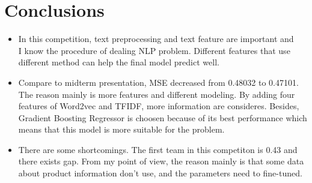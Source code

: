 \section{Conclusions} \label{sec-conclusions}
\begin{itemize}
	\item  In this competition, text preprocessing and text feature are important and
	\smallskip 
	\\I know the procedure of dealing NLP problem. Different features that use different method can help the final model predict well. 
	\item  Compare to midterm presentation, MSE decreased from 0.48032 to 0.47101. The reason mainly is more features and different modeling. By adding four features of Word2vec and TFIDF, more information are consideres. Besides, Gradient Boosting Regressor is choosen because of its best performance which means that this model is more suitable for the problem.
	\item  There are some shortcomings. The first team in this competiton is 0.43 and there exists gap. From my point of view, the reason mainly is that some data about product information don't use, and the parameters need to fine-tuned. 
\end{itemize}

